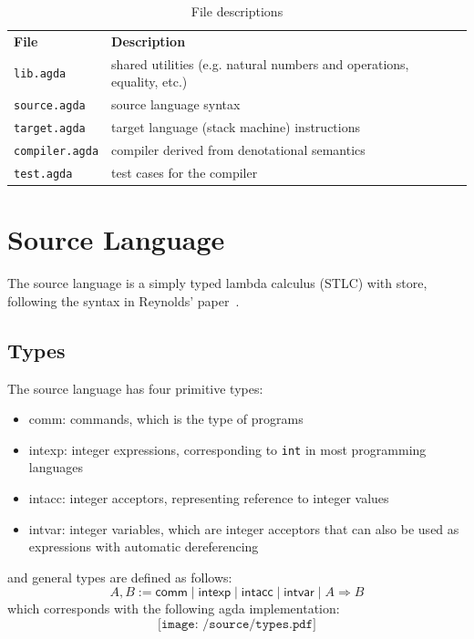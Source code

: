 \documentclass[12pt,a4paper]{report}
\theoremstyle{definition}
\begin{document}
        \begin{table}[H]
            \centering
            \begin{tabular}{|l|l|l|}
                \hline
                \textbf{File} & \textbf{Description}\\
                \hhline{|=|=|}
                \texttt{lib.agda} & shared utilities (e.g. natural numbers and operations, equality, etc.) \\
                \hline
                \texttt{source.agda} & source language syntax \\
                \hline
                \texttt{target.agda} & target language (stack machine) instructions \\
                \hline
                \texttt{compiler.agda} & compiler derived from denotational semantics \\
                \hline
                \texttt{test.agda} & test cases for the compiler \\
                \hline
            \end{tabular}
            \caption{File descriptions}
            \label{tab: file_descriptions}
        \end{table}

    \section{Source Language} \label{sec: source}
    The source language is a simply typed lambda calculus (STLC) with store, following the syntax in Reynolds' paper~\autocite{Reynolds}.
        \subsection{Types}
        The source language has four primitive types:
        \begin{itemize}
            \item 
                \textsf{comm}: commands, which is the type of programs
            \item 
                \textsf{intexp}: integer expressions, corresponding to \texttt{int} in most programming languages
            \item 
                \textsf{intacc}: integer acceptors, representing reference to integer values
            \item 
                \textsf{intvar}: integer variables, which are integer acceptors that can also be used as expressions with automatic dereferencing
        \end{itemize}
        and general types are defined as follows: 
        \[ A, B := \textsf{comm} \mid \textsf{intexp} \mid \textsf{intacc} \mid \textsf{intvar} \mid A \Rightarrow B \] 
        which corresponds with the following agda implementation:
        \[\texttt{[image: /source/types.pdf]}\]
\end{document}
